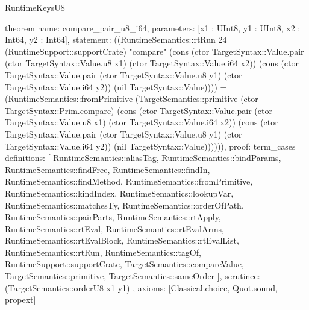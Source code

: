 \begin{lexlean}{RuntimeKeysU8}
\begin{semanticmodule}
theorem{
  name: compare_pair_u8_i64,
  parameters: [x1 : UInt8, y1 : UInt8, x2 : Int64, y2 : Int64],
  statement: ((RuntimeSemantics::rtRun 24 (RuntimeSupport::supportCrate) "compare" (cons (ctor TargetSyntax::Value.pair (ctor TargetSyntax::Value.u8 x1) (ctor TargetSyntax::Value.i64 x2)) (cons (ctor TargetSyntax::Value.pair (ctor TargetSyntax::Value.u8 y1) (ctor TargetSyntax::Value.i64 y2)) (nil TargetSyntax::Value)))) = (RuntimeSemantics::fromPrimitive (TargetSemantics::primitive (ctor TargetSyntax::Prim.compare) (cons (ctor TargetSyntax::Value.pair (ctor TargetSyntax::Value.u8 x1) (ctor TargetSyntax::Value.i64 x2)) (cons (ctor TargetSyntax::Value.pair (ctor TargetSyntax::Value.u8 y1) (ctor TargetSyntax::Value.i64 y2)) (nil TargetSyntax::Value)))))),
  proof: term_cases{
    definitions: [
      RuntimeSemantics::aliasTag,
      RuntimeSemantics::bindParams,
      RuntimeSemantics::findFree,
      RuntimeSemantics::findIn,
      RuntimeSemantics::findMethod,
      RuntimeSemantics::fromPrimitive,
      RuntimeSemantics::kindIndex,
      RuntimeSemantics::lookupVar,
      RuntimeSemantics::matchesTy,
      RuntimeSemantics::orderOfPath,
      RuntimeSemantics::pairParts,
      RuntimeSemantics::rtApply,
      RuntimeSemantics::rtEval,
      RuntimeSemantics::rtEvalArms,
      RuntimeSemantics::rtEvalBlock,
      RuntimeSemantics::rtEvalList,
      RuntimeSemantics::rtRun,
      RuntimeSemantics::tagOf,
      RuntimeSupport::supportCrate,
      TargetSemantics::compareValue,
      TargetSemantics::primitive,
      TargetSemantics::sameOrder
    ],
    scrutinee: (TargetSemantics::orderU8 x1 y1)
  },
  axioms: [Classical.choice, Quot.sound, propext]
}
\end{semanticmodule}
\end{lexlean}
